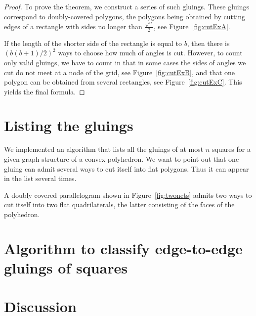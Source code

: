 \documentclass[a4paper,USenglish,cleveref, autoref, thm-restate]{socg-lipics-v2019}
\begin{document}
\begin{proof} To prove the theorem, we construct a series of such gluings. These gluings correspond to doubly-covered polygons, the polygons being obtained by cutting edges of a rectangle with sides no longer than $\frac{\sqrt{n}}{2}$, see Figure~\ref{fig:cutExA}.



If the length of the shorter side of the rectangle is equal to $b$, then there is $\left( b(b+1) / 2 \right)^2$ ways to choose how much of angles is cut. However, to count only valid gluings, we have to count in that in some cases the sides of angles we cut do not meet at a node of the grid, see Figure~\ref{fig:cutExB}, and that one polygon can be obtained from several rectangles, see Figure~\ref{fig:cutExC}. This yields the final formula.\end{proof}

\section{Listing the gluings}

We implemented an algorithm that lists all the gluings of at most $n$ squares for a given graph structure of a convex polyhedron. We want to point out that one gluing can admit several ways to cut itself into flat polygons. Thus it can appear in the list several times.



\begin{example}
	A doubly covered parallelogram shown in Figure~\ref{fig:twonets} admits two ways to cut itself into two flat quadrilaterals, the latter consisting of the faces of the polyhedron.
\end{example}

\section{Algorithm to classify edge-to-edge gluings of squares}

\section{Discussion}

% 
\end{document}
